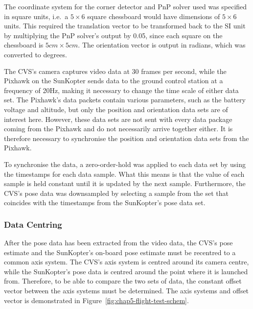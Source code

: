 The coordinate system for the corner detector and PnP solver used was specified in square units, i.e.\ a $5\times6$ square chessboard would have dimensions of $5\times6$ units. This required the translation vector to be transformed back to the SI unit by multiplying the PnP solver's output by 0.05, since each square on the chessboard is $5cm\times5cm$. The orientation vector is output in radians, which was converted to degrees. 

The CVS's camera captures video data at 30 frames per second, while the Pixhawk on the SunKopter sends data to the ground control station at a frequency of 20Hz, making it necessary to change the time scale of either data set. The Pixhawk's data packets contain various parameters, such as the battery voltage and altitude, but only the position and orientation data sets are of interest here. However, these data sets are not sent with every data package coming from the Pixhawk and do not necessarily arrive together either. It is therefore necessary to synchronise the position and orientation data sets from the Pixhawk.

To synchronise the data, a zero-order-hold was applied to each data set by using the timestamps for each data sample. What this means is that the value of each sample is held constant until it is updated by the next sample. Furthermore, the CVS's pose data was downsampled by selecting a sample from the set that coincides with the timestamps from the SunKopter's pose data set. 

\subsubsection{Data Centring}

After the pose data has been extracted from the video data, the CVS's pose estimate and the SunKopter's on-board pose estimate must be recentred to a common axis system. The CVS's axis system is centred around its camera centre, while the SunKopter's pose data is centred around the point where it is launched from. Therefore, to be able to compare the two sets of data, the constant offset vector between the axis systems must be determined. The axis systems and offset vector is demonstrated in Figure~\ref{fig:chap5-flight-test-schem}.

